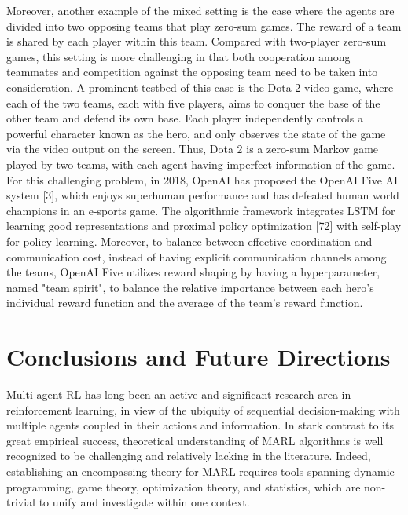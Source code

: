 \documentclass[10pt]{article}
\begin{document}
Moreover, another example of the mixed setting is the case where the agents are divided into two opposing teams that play zero-sum games. The reward of a team is shared by each player within this team. Compared with two-player zero-sum games, this setting is more challenging in that both cooperation among teammates and competition against the opposing team need to be taken into consideration. A prominent testbed of this case is the Dota 2 video game, where each of the two teams, each with five players, aims to conquer the base of the other team and defend its own base. Each player independently controls a powerful character known as the hero, and only observes the state of the game via the video output on the screen. Thus, Dota 2 is a zero-sum Markov game played by two teams, with each agent having imperfect information of the game. For this challenging problem, in 2018, OpenAI has proposed the OpenAI Five AI system [3], which enjoys superhuman performance and has defeated human world champions in an e-sports game. The algorithmic framework integrates LSTM for learning good representations and proximal policy optimization [72] with self-play for policy learning. Moreover, to balance between effective coordination and communication cost, instead of having explicit communication channels among the teams, OpenAI Five utilizes reward shaping by having a hyperparameter, named "team spirit", to balance the relative importance between each hero's individual reward function and the average of the team's reward function.

\section{Conclusions and Future Directions}
Multi-agent RL has long been an active and significant research area in reinforcement learning, in view of the ubiquity of sequential decision-making with multiple agents coupled in their actions and information. In stark contrast to its great empirical success, theoretical understanding of MARL algorithms is well recognized to be challenging and relatively lacking in the literature. Indeed, establishing an encompassing theory for MARL requires tools spanning dynamic programming, game theory, optimization theory, and statistics, which are non-trivial to unify and investigate within one context.
\end{document}
